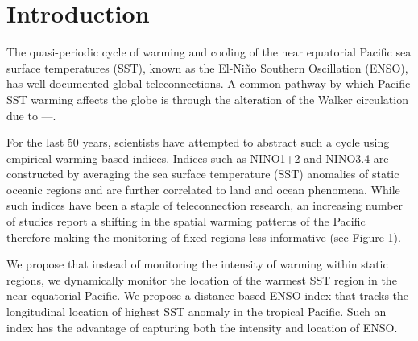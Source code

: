 \section{Introduction}



The quasi-periodic cycle of warming and cooling of the near equatorial Pacific sea surface temperatures (SST), known as the El-Ni\~no Southern Oscillation (ENSO), has well-documented global teleconnections. A common pathway by which Pacific SST warming affects the globe is through the alteration of the Walker circulation due to ---. 

For the last 50 years, scientists have attempted to abstract such a cycle using empirical warming-based indices. Indices such as NINO1+2 and NINO3.4 are constructed by averaging the sea surface temperature (SST) anomalies of static oceanic regions and are further correlated to land and ocean phenomena. While such indices have been a staple of teleconnection research, an increasing number of studies report a shifting in the spatial warming patterns of the Pacific therefore making the monitoring of fixed regions less informative (see Figure 1). 

We propose that instead of monitoring the intensity of warming within static regions, we dynamically monitor the location of the warmest SST region in the near equatorial Pacific. We propose a distance-based ENSO index that tracks the longitudinal location of highest SST anomaly in the tropical Pacific. Such an index has the advantage of capturing both the intensity and location of ENSO.



